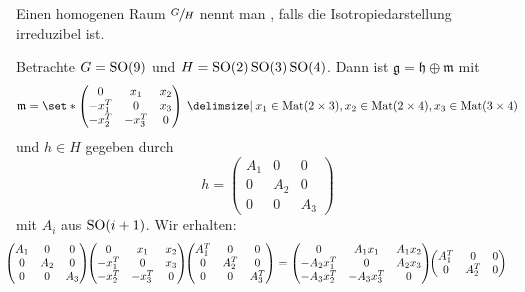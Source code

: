 \begin{definition}[{name=[{isotropie-irreduzibel}]}]
	Einen homogenen Raum $\sfrac{G}{H}$ nennt man , falls die Isotropiedarstellung irreduzibel ist. 
\end{definition}

\begin{beispiel*}[{name=[Beispiel für nicht irreduzible Isotropiedarstellung]}]
	Betrachte $G= \operatorname{SO}(9)$ und $H = \operatorname{SO}(2) \operatorname{SO}(3) \operatorname{SO}(4)$.
	Dann ist $\mathfrak{g} = \mathfrak{h} \oplus \mathfrak{m}$ mit
	\[
		\mathfrak{m} = \set*{\begin{pmatrix}
			0 & x_1 & x_2 \\
			- x_1^T & 0 & x_3 \\
			-x_2^T & -x_3^T & 0
		\end{pmatrix} \given x_1 \in \Mat(2\times 3), x_2 \in \Mat(2 \times 4), x_3 \in \Mat(3\times 4)} 
	\]
	und $h \in H$ gegeben durch
	\[
		h = \begin{pmatrix}
			A_1 & 0 & 0 \\
			0 & A_2 & 0 \\
			0 & 0 & A_3
		\end{pmatrix}
	\]
	mit $A_i$ aus $\operatorname{SO}(i+1)$.
	Wir erhalten:
	\begin{align}
		\hspace{-1em}\begin{pmatrix}
			A_1 & 0 & 0 \\
			0 & A_2 & 0 \\
			0 & 0 & A_3
		\end{pmatrix}\!\!
		\begin{pmatrix}
			0 & x_1 & x_2 \\
			- x_1^T & 0 & x_3 \\
			-x_2^T & -x_3^T & 0
		\end{pmatrix}\!\!
		\begin{pmatrix}
			A_1^T & 0 & 0 \\
			0 & A_2^T & 0 \\
			0 & 0 & A_3^T
		\end{pmatrix} &=
		\begin{pmatrix}
			0 & A_1 x_1 & A_1 x_2 \\
			- A_2 x_1^T & 0 & A_2 x_3 \\
			- A_3 x_2^T & -A_3 x_3^T & 0
		\end{pmatrix}\!\!
		\begin{pmatrix}
			A_1^T & 0 & 0 \\
			0 & A_2^T & 0 \\

\end{pmatrix}
\end{align}
\end{beispiel*}
